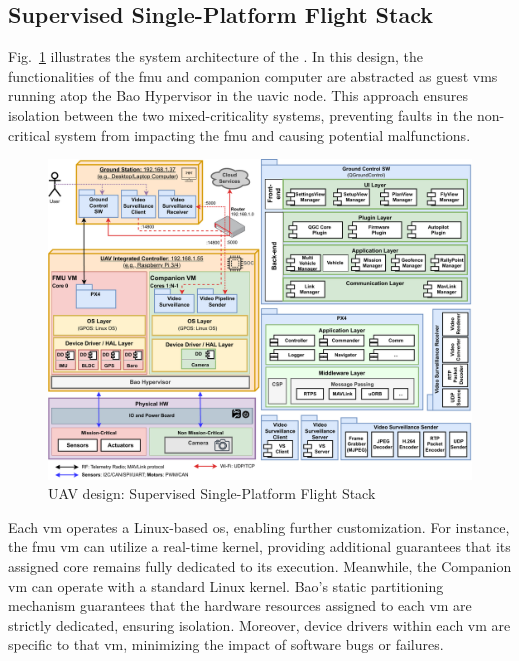 \subsection{Supervised Single-Platform Flight Stack}
\label{sec:superv-stack}
Fig.~\ref{fig:uav-design-sup} illustrates the system architecture of the
. In this design, the functionalities of the \gls{fmu} and
companion computer are abstracted as guest \glspl{vm} running atop the Bao
Hypervisor in the \gls{uavic} node. This approach ensures isolation between the two mixed-criticality
systems, preventing faults in the non-critical system from impacting the
\gls{fmu} and causing potential malfunctions.

\begin{figure}[!hbt]
  \centering
  \includegraphics[width=1.0\textwidth]{./img/pdf/uav-main-design-sup.pdf} 
%   
  \caption{UAV design: Supervised Single-Platform Flight Stack}%
  \label{fig:uav-design-sup}
\end{figure}

Each \gls{vm} operates a Linux-based \gls{os}, enabling further
customization. For instance, the \gls{fmu} \gls{vm} can utilize a real-time
kernel, providing additional guarantees that its assigned core remains fully
dedicated to its execution. Meanwhile, the Companion \gls{vm} can operate with a
standard Linux kernel. Bao's static partitioning mechanism guarantees that the
hardware resources assigned to each \gls{vm} are strictly dedicated, ensuring
isolation. Moreover, device drivers within each \gls{vm} are specific to that
\gls{vm}, minimizing the impact of software bugs or failures.

